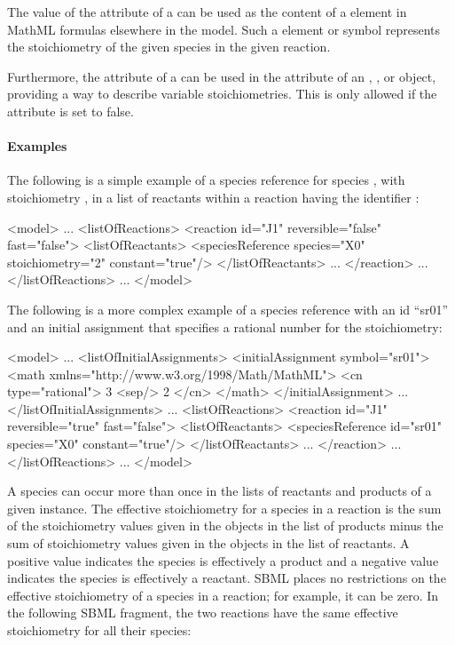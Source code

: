 The value of the  attribute of a \SpeciesReference can be
used as the content of a  element in MathML formulas
elsewhere in the model. Such a  element or symbol
represents the stoichiometry of the given species in the given reaction.

Furthermore, the  attribute of a \SpeciesReference can be
used in the  attribute of an \InitialAssignment, \RateRule,
\AssignmentRule or \EventAssignment object, providing a way to describe
variable stoichiometries. This is only allowed if the 
 attribute is set to false. 


\paragraph{Examples}

The following is a simple example of a species reference for
species , with stoichiometry , in a list of
reactants within a reaction having the identifier :

\begin{example}
<model>
    ...
    <listOfReactions>
        <reaction id="J1" reversible="false" fast="false">
            <listOfReactants>
                <speciesReference species="X0" stoichiometry="2" constant="true"/>
            </listOfReactants>
            ...
        </reaction>
        ...
    </listOfReactions>
    ...
</model>
\end{example}

The following is a more complex example of a species reference with an id ``sr01'' and 
an initial assignment that specifies a rational number for the stoichiometry:


\begin{example}
<model>
    ...
    <listOfInitialAssignments>
        <initialAssignment symbol="sr01">
            <math xmlns="http://www.w3.org/1998/Math/MathML">
                <cn type="rational"> 3 <sep/> 2 </cn>
            </math>
        </initialAssignment>
        ...
    </listOfInitialAssignments>
	...
    <listOfReactions>
        <reaction id="J1" reversible="true" fast="false">
            <listOfReactants>
                <speciesReference id="sr01" species="X0" constant="true"/>
            </listOfReactants>
            ...
        </reaction>
        ...
    </listOfReactions>
    ...
</model>
\end{example}


A species can occur more than once in the lists of reactants and
products of a given \Reaction instance.  The effective
stoichiometry for a species in a reaction is the sum of the
stoichiometry values given in the \SpeciesReference objects in
the list of products minus the sum of stoichiometry values given
in the \SpeciesReference objects in the list of reactants.  A
positive value indicates the species is effectively a product and
a negative value indicates the species is effectively a reactant.
SBML places no restrictions on the effective stoichiometry of a
species in a reaction; for example, it can be zero.  In the
following SBML fragment, the two reactions have the same effective
stoichiometry for all their species:

